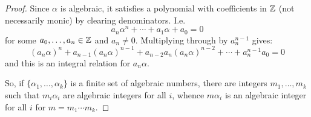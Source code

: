 \begin{proof} 
    Since $\alpha$ is algebraic, it satisfies a polynomial with coefficients in $\mathbb{Z}$ (not necessarily monic) by clearing denominators. I.e.
    \[ a_n\alpha^n + \cdots + a_1\alpha + a_0 = 0 \]
    for some $a_0,\ldots,a_n \in \mathbb{Z}$ and $a_n \neq 0$. Multiplying through by $a_n^{n-1}$ gives:
    \[ (a_n\alpha)^n + a_{n-1}(a_n\alpha)^{n-1} + a_{n-2}a_n(a_n\alpha)^{n-2} + \cdots + a_n^{n-1}a_0 = 0 \]
    and this is an integral relation for $a_n\alpha$.

    So, if $\{\alpha_1,\ldots,\alpha_k\}$ is a finite set of algebraic numbers, there are integers $m_1,\ldots,m_k$ such that $m_i\alpha_i$ are algebraic integers for all $i$, whence $m\alpha_i$ is an algebraic integer for all $i$ for $m = m_1\cdots m_k$.
\end{proof}

